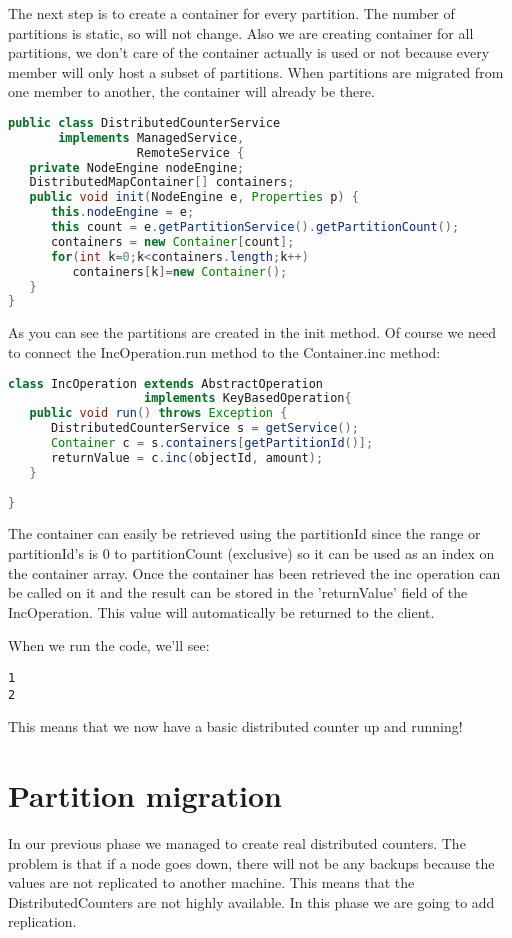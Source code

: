 The next step is to create a container for every partition. The number of partitions is static, so will not change. Also we are creating container for all partitions, we don't care of the container actually is used or not because every member will only host a subset of partitions. When partitions are migrated from one member to another, the container will already be there.
\begin{lstlisting}[language=java]
public class DistributedCounterService 
       implements ManagedService, 
                  RemoteService {
   private NodeEngine nodeEngine;
   DistributedMapContainer[] containers;
   public void init(NodeEngine e, Properties p) {
      this.nodeEngine = e;
      this count = e.getPartitionService().getPartitionCount();
      containers = new Container[count];
      for(int k=0;k<containers.length;k++) 
         containers[k]=new Container();
   }
}
\end{lstlisting}
As you can see the partitions are created in the init method. Of course we need to connect the IncOperation.run method to the Container.inc method:
\begin{lstlisting}[language=java]
class IncOperation extends AbstractOperation 
                   implements KeyBasedOperation{  
   public void run() throws Exception {
      DistributedCounterService s = getService();
      Container c = s.containers[getPartitionId()];
      returnValue = c.inc(objectId, amount);
   }
  
}
\end{lstlisting}
The container can easily be retrieved using the partitionId since the range or partitionId's is 0 to partitionCount (exclusive) so it can be used as an index on the container array. Once the container has been retrieved the inc operation can be called on it and the result can be stored in the 'returnValue' field of the IncOperation. This value will automatically be returned to the client.

When we run the code, we'll see:
\begin{lstlisting}
1
2
\end{lstlisting}
This means that we now have a basic distributed counter up and running!

\section{Partition migration}
In our previous phase we managed to create real distributed counters. The problem is that if a node goes down, there will not be any backups because the values are not replicated to another machine. This means that the DistributedCounters are not highly available. In this phase we are going to add replication.

